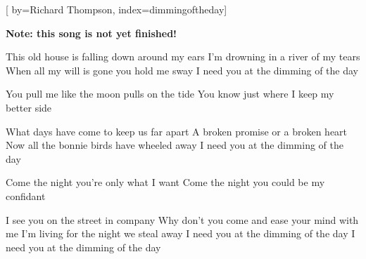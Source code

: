 

[%
    by={Richard Thompson},
    index={dimmingoftheday}]


    \label{dimmingoftheday}

    \textbf{Note: this song is not yet finished!}

    \beginverse
        This old house is falling down around my ears
        I'm drowning in a river of my tears
        When all my will is gone you hold me sway
        I need you at the dimming of the day

        You pull me like the moon pulls on the tide
        You know just where I keep my better side

        What days have come to keep us far apart
        A broken promise or a broken heart
        Now all the bonnie birds have wheeled away
        I need you at the dimming of the day

        Come the night you're only what I want
        Come the night you could be my confidant

        I see you on the street in company
        Why don't you come and ease your mind with me
        I'm living for the night we steal away
        I need you at the dimming of the day
        I need you at the dimming of the day
    \endverse
\endsong
